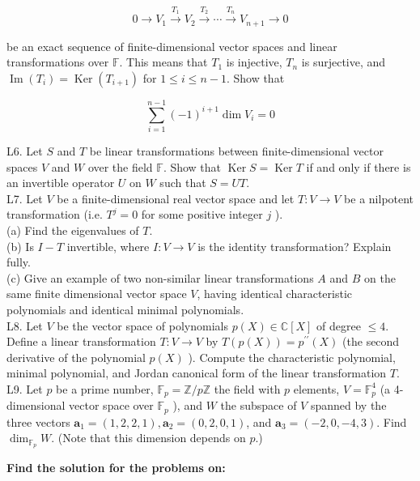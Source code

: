 $$
0 \longrightarrow V_{1} \xrightarrow{T_{1}} V_{2} \xrightarrow{T_{2}} \cdots \xrightarrow{T_{n}} V_{n+1} \longrightarrow 0
$$

be an exact sequence of finite-dimensional vector spaces and linear transformations over $\mathbb{F}$. This means that $T_{1}$ is injective, $T_{n}$ is surjective, and $\operatorname{Im}\left(T_{i}\right)=\operatorname{Ker}\left(T_{i+1}\right)$ for $1 \leq i \leq n-1$. Show that

$$
\sum_{i=1}^{n-1}(-1)^{i+1} \operatorname{dim} V_{i}=0
$$

L6. Let $S$ and $T$ be linear transformations between finite-dimensional vector spaces $V$ and $W$ over the field $\mathbb{F}$. Show that $\operatorname{Ker} S=\operatorname{Ker} T$ if and only if there is an invertible operator $U$ on $W$ such that $S=U T$.\\
L7. Let $V$ be a finite-dimensional real vector space and let $T: V \rightarrow V$ be a nilpotent transformation (i.e. $T^{j}=0$ for some positive integer $j$ ).\\
(a) Find the eigenvalues of $T$.\\
(b) Is $I-T$ invertible, where $I: V \rightarrow V$ is the identity transformation? Explain fully.\\
(c) Give an example of two non-similar linear transformations $A$ and $B$ on the same finite dimensional vector space $V$, having identical characteristic polynomials and identical minimal polynomials.\\
L8. Let $V$ be the vector space of polynomials $p(X) \in \mathbb{C}[X]$ of degree $\leq 4$. Define a linear transformation $T: V \rightarrow V$ by $T(p(X))=p^{\prime \prime}(X)$ (the second derivative of the polynomial $p(X)$ ). Compute the characteristic polynomial, minimal polynomial, and Jordan canonical form of the linear transformation $T$.\\
L9. Let $p$ be a prime number, $\mathbb{F}_{p}=\mathbb{Z} / p \mathbb{Z}$ the field with $p$ elements, $V=\mathbb{F}_{p}^{4}$ (a 4-dimensional vector space over $\mathbb{F}_{p}$ ), and $W$ the subspace of $V$ spanned by the three vectors $\mathbf{a}_{1}=(1,2,2,1), \mathbf{a}_{2}=(0,2,0,1)$, and $\mathbf{a}_{3}=(-2,0,-4,3)$. Find $\operatorname{dim}_{\mathbb{F}_{p}} W$. (Note that this dimension depends on $p$.)

\newpage
\textbf{Find the solution for the problems on: }